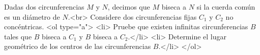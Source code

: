 Dadas dos circunferencias $M$ y $N$, decimos que $M$ biseca a $N$ si la cuerda común es un diámetro de $N$.<br>
Considere dos circunferencias fijas $C_1$ y $C_2$ no concéntricas.
<ol type="a">
  <li> Pruebe que existen infinitas circunferencias $B$ tales que $B$ biseca a $C_1$ y $B$ biseca a $C_2$.</li>
  <li> Determine el lugar geométrico de los centros de las circunferencias $B$.</li>
</ol>

